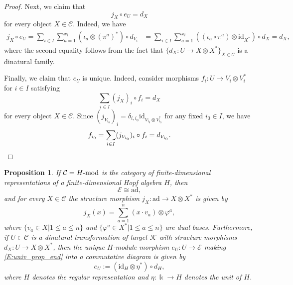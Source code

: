 \documentclass[a4paper,reqno]{amsart}
\newtheorem{proposition}[theorem]{Proposition}
\theoremstyle{definition}
\theoremstyle{remark}
\newcommand{\calC}{\mathcal{C}}
\newcommand{\calE}{\mathcal{E}}
\newcommand{\calK}{\mathcal{K}}
\renewcommand{\phi}{\varphi}
\newcommand{\ad}{\mathrm{ad}}
\newcommand{\id}{\mathrm{id}}
\newcommand{\leqs}{\leqslant}
\newcommand{\mods}[1]{\operatorname{\mathnormal{#1}-mod}}
\begin{document}
\begin{proof}
 Next, we claim that
 \[
  j_X \circ e_U = d_X
 \]
 for every object $X \in \calC$. Indeed, we have
 \begin{align*}
  j_X \circ e_U = \sum_{i \in I} \sum_{a=1}^{x_i} \left( \iota_a \otimes (\pi^a)^* \right) \circ d_{V_i} &= \sum_{i \in I} \sum_{a=1}^{x_i} \left( (\iota_a \circ \pi^a) \otimes \id_{X^*} \right) \circ d_X 
  = d_X,
 \end{align*}
 where the second equality follows from the fact that $\{ d_X : U \to X \otimes X^* \}_{X \in \calC}$ is a dinatural family.
 
 Finally, we claim that $e_U$ is unique. Indeed, consider morphisms $f_i : U \to V_i \otimes V_i^*$ for $i \in I$ satisfying
 \[
  \sum_{i \in I} (j_X)_i \circ f_i = d_X
 \]
 for every object $X \in \calC$. Since $(j_{V_{i_0}})_i = \delta_{i,i_0} \id_{V_{i_0} \otimes V_{i_0}^*}$ for any fixed $i_0 \in I$, we have
 \[
  f_{i_0} = \sum_{i \in I} (j_{V_{i_0}})_i \circ f_i = d_{V_{i_0}}. \qedhere
 \]
\end{proof}

\begin{proposition}\label{P:end_H-mod}
 If $\calC = \mods{H}$ is the category of finite-dimensional representations of a finite-dimensional Hopf algebra $H$, then
 \[
  \calE \cong \ad,
 \]
 and for every $X \in \calC$ the structure morphism $j_X : \ad \to X \otimes X^*$ is given by
 \[
  j_X(x) = \sum_{a=1}^n (x \cdot v_a) \otimes \phi^a,
 \]
 where $\{ v_a \in X | 1 \leqs a \leqs n \}$ and $\{ \phi^a \in X^* | 1 \leqs a \leqs n \}$ are dual bases. Furthermore, if $U \in \calC$ is a dinatural transformation of target $\calK$ with structure morphisms $d_X : U \to X \otimes X^*$, then the unique $H$-module morphism $e_U : U \to \calE$ making \eqref{E:univ_prop_end} into a commutative diagram is given by
 \[
  e_U := (\id_H \otimes \eta^*) \circ d_H,
 \]
 where $H$ denotes the regular representation and $\eta : \Bbbk \to H$ denotes the unit of $H$. 
\end{proposition}
\end{document}
